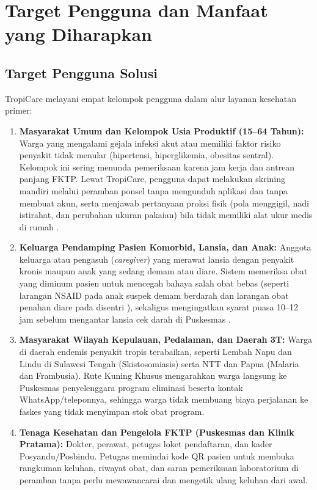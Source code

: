 
\section{Target Pengguna dan Manfaat yang Diharapkan}

\subsection{Target Pengguna Solusi}

TropiCare melayani empat kelompok pengguna dalam alur layanan kesehatan primer:

\begin{enumerate}
    \item \textbf{Masyarakat Umum dan Kelompok Usia Produktif (15--64 Tahun):} 
    Warga yang mengalami gejala infeksi akut atau memiliki faktor risiko penyakit tidak menular (hipertensi, hiperglikemia, obesitas sentral). Kelompok ini sering menunda pemeriksaan karena jam kerja dan antrean panjang FKTP. Lewat TropiCare, pengguna dapat melakukan skrining mandiri melalui peramban ponsel tanpa mengunduh aplikasi dan tanpa membuat akun, serta menjawab pertanyaan proksi fisik (pola menggigil, nadi istirahat, dan perubahan ukuran pakaian) bila tidak memiliki alat ukur medis di rumah \citep{Kemenkes2024}.
    
    \item \textbf{Keluarga Pendamping Pasien Komorbid, Lansia, dan Anak:} 
    Anggota keluarga atau pengasuh (\textit{caregiver}) yang merawat lansia dengan penyakit kronis maupun anak yang sedang demam atau diare. Sistem memeriksa obat yang diminum pasien untuk mencegah bahaya salah obat bebas (seperti larangan NSAID pada anak suspek demam berdarah dan larangan obat penahan diare pada disentri \citep{Alam2022,Koo2007}), sekaligus mengingatkan syarat puasa 10--12 jam sebelum mengantar lansia cek darah di Puskesmas \citep{PERKENI2024}.
    
    \item \textbf{Masyarakat Wilayah Kepulauan, Pedalaman, dan Daerah 3T:} 
    Warga di daerah endemis penyakit tropis terabaikan, seperti Lembah Napu dan Lindu di Sulawesi Tengah (Skistosomiasis) serta NTT dan Papua (Malaria dan Frambusia). Rute Kuning Khusus mengarahkan warga langsung ke Puskesmas penyelenggara program eliminasi beserta kontak WhatsApp/teleponnya, sehingga warga tidak membuang biaya perjalanan ke faskes yang tidak menyimpan stok obat program.
    
    \item \textbf{Tenaga Kesehatan dan Pengelola FKTP (Puskesmas dan Klinik Pratama):} 
    Dokter, perawat, petugas loket pendaftaran, dan kader Posyandu/Posbindu. Petugas memindai kode QR pasien untuk membuka rangkuman keluhan, riwayat obat, dan saran pemeriksaan laboratorium di peramban tanpa perlu mewawancarai dan mengetik ulang keluhan dari awal.
\end{enumerate}

